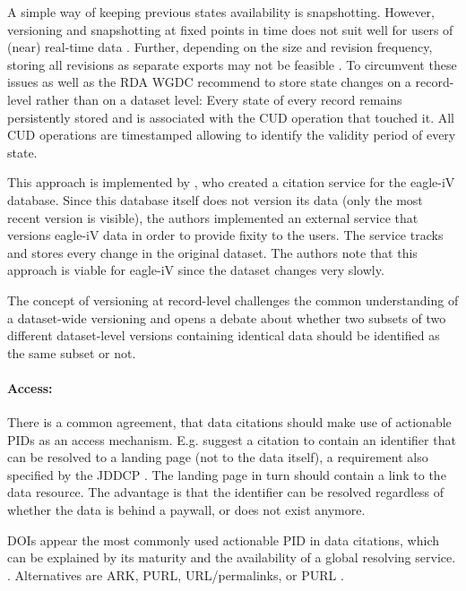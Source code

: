 \documentclass[a4paper,10pt]{article}
\begin{document}
A simple way of keeping previous states availability is snapshotting. However, versioning and snapshotting at fixed points in time does not suit well for users of (near) real-time data  \citep{Huber2015}. Further, depending on the size and revision frequency, storing all revisions as separate exports may not be feasible \citep{Rauber2015}. To circumvent these issues \cite{AltKin07} as well as the \gls{RDA} \gls{WGDC} \citep{Rauber2015a, Rauber2015, Proll2013} recommend to store state changes on a record-level rather than on a dataset level: Every state of every record remains persistently stored and is associated with the \gls{CUD} operation that touched it. All \gls{CUD} operations are timestamped allowing to identify the validity period of every state.

This approach is implemented by \cite{Alawini2017}, who created a citation service for the eagle-iV database. Since this database itself does not version its data (only the most recent version is visible), the authors implemented an external service that versions eagle-iV data in order to provide fixity to the users. The service tracks and stores every change in the original dataset.  The authors note that this approach is viable for eagle-iV since the dataset changes very slowly.

The concept of versioning at record-level challenges the common understanding of a dataset-wide versioning and opens a debate about whether two subsets of two different dataset-level versions containing identical data should be identified as the same subset or not. 


\paragraph{Access:}
There is a common agreement, that data citations should make use of actionable \glspl{PID} as an access mechanism. E.g. \cite{AltKin07} suggest a citation to contain an identifier that can be resolved to a landing page (not to the data itself), a requirement also specified by the \gls{JDDCP} \citep{Fenner2016}.
The landing page in turn should contain a link to the data resource. The advantage is that the identifier can be resolved regardless of whether the data is behind a paywall, or does not exist anymore.

\glspl{DOI} appear the most commonly used actionable \gls{PID} in data citations, which can be explained by its maturity and the availability of a global resolving service.  \citep{Honor2016}. Alternatives are \gls{ARK}, \gls{PURL}, \gls{URL}/permalinks, or \gls{PURL} \citep{Klump2016, Starr2015}.
\end{document}
